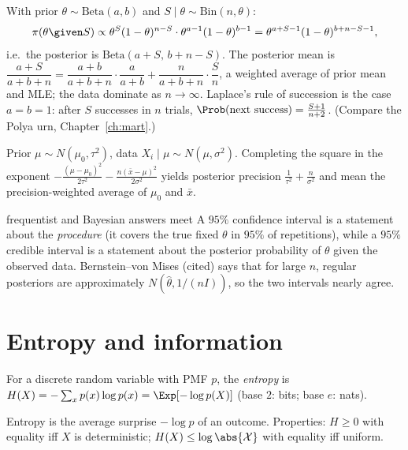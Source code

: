\begin{example}
With prior $\theta\sim\mathrm{Beta}(a,b)$ and $S\mid\theta\sim\mathrm{Bin}(n,\theta)$:
\[
\pi(\theta\given S)\propto\theta^{S}(1-\theta)^{n-S}\cdot\theta^{a-1}(1-\theta)^{b-1}=\theta^{a+S-1}(1-\theta)^{b+n-S-1},
\]
i.e.\ the posterior is $\mathrm{Beta}(a+S,\,b+n-S)$. The posterior mean is
$\dfrac{a+S}{a+b+n}=\dfrac{a+b}{a+b+n}\cdot\dfrac a{a+b}+\dfrac n{a+b+n}\cdot\dfrac Sn$, a weighted average of prior mean and MLE;
the data dominate as $n\to\infty$. Laplace's rule of succession is the case $a=b=1$: after $S$ successes in
$n$ trials, $\Prob(\text{next success})=\frac{S+1}{n+2}$. (Compare the Polya urn, Chapter~\ref{ch:mart}.)
\end{example}

\begin{example}
Prior $\mu\sim N(\mu_0,\tau^2)$, data $X_i\mid\mu\sim N(\mu,\sigma^2)$. Completing the square in the exponent
$-\frac{(\mu-\mu_0)^2}{2\tau^2}-\frac{n(\bar x-\mu)^2}{2\sigma^2}$ yields posterior precision
$\frac1{\tau^2}+\frac n{\sigma^2}$ and mean the precision-weighted average of $\mu_0$ and $\bar x$.
\end{example}

\begin{nuance}{frequentist and Bayesian answers meet}
A $95\%$ confidence interval is a statement about the \emph{procedure} (it covers the true fixed
$\theta$ in $95\%$ of repetitions), while a $95\%$ credible interval is a statement about the posterior
probability of $\theta$ given the observed data. Bernstein--von Mises (cited) says that for large $n$,
regular posteriors are approximately $N(\hat\theta,1/(nI))$, so the two intervals nearly agree.
\end{nuance}

\section{Entropy and information}

\begin{definition}[Entropy]
For a discrete random variable with PMF $p$, the \emph{entropy} is
$H(X)=-\sum_xp(x)\log p(x)=\Exp[-\log p(X)]$ (base $2$: bits; base $e$: nats).
\end{definition}

Entropy is the average surprise $-\log p$ of an outcome. Properties: $H\ge0$ with equality iff $X$ is
deterministic; $H(X)\le\log\abs{\mathcal X}$ with equality iff uniform.

